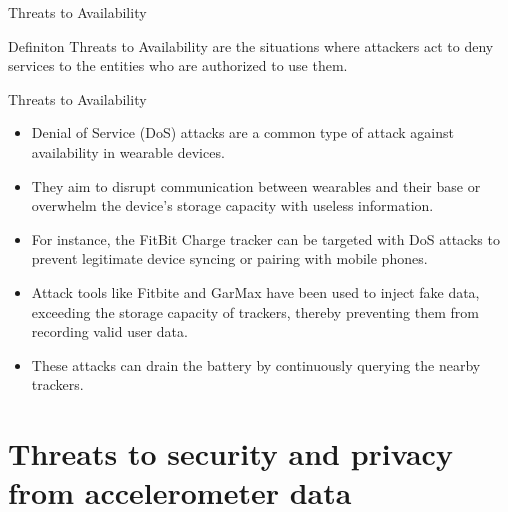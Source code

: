 \documentclass[ucs,9pt]{beamer}
\begin{document}
\begin{frame}{Threats to Availability}
	
	\begin{alertblock}{Definiton}
		Threats to Availability are the situations where attackers act  to deny services to the entities who are authorized to use them.
	\end{alertblock}
\end{frame}

\begin{frame}{Threats to Availability}
	\begin{itemize}
		\item Denial of Service (DoS) attacks are a common type of attack against availability in wearable devices. 
		\item They aim to disrupt communication between wearables and their base or overwhelm the device's storage capacity with useless information. 
		\item For instance, the FitBit Charge tracker can be targeted with DoS attacks to prevent legitimate device syncing or pairing with mobile phones.
		\item Attack tools like Fitbite and GarMax have been used to inject fake data, exceeding the storage capacity of trackers, thereby preventing them from recording valid user data.
		\item These attacks can drain the battery by continuously querying the nearby trackers. 
	\end{itemize}
\end{frame}



\section{Threats to security and privacy from accelerometer data}
\end{document}
